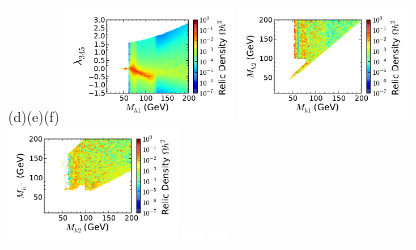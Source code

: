 \begin{figure}[htb]
\vskip 0.2cm
\hspace*{1.4cm}(d)\hspace*{0.35\textwidth}\hspace*{-1.4cm}(e)\hspace*{0.35\textwidth}\hspace*{-1.5cm}(f)
\vskip 0.0cm
%
{\hspace*{-0.3cm}\includegraphics[width=0.4\textwidth]{Figures/Mh1_ld345_Omega_small-cut1234567_z.pdf}}%
{\hspace*{-1.55cm}\includegraphics[width=0.4\textwidth]{Figures/Mh1_Mh2_Omega_small-cut1234567_z.pdf}}%
{\hspace*{-1.55cm}\includegraphics[width=0.4\textwidth]{Figures/Mhc_Mh2_Omega_small-cut1234567_z.pdf}}%
\vskip -5.2cm
\hspace*{4.9cm}\includegraphics[width=0.55cm,height=4.cm]{Figures/blank.pdf}%
\hspace*{4.9cm}\includegraphics[width=0.55cm,height=4.cm]{Figures/blank.pdf}%

\end{figure}
